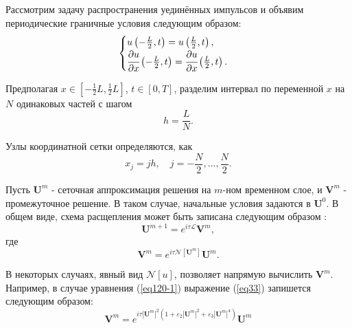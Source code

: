 \documentclass[14pt,a4paper]{extreport}
\begin{document}
			Рассмотрим задачу распространения уединённых импульсов и объявим периодические граничные условия следующим образом:
			\begin{equation} \label{eq30}
				\begin{aligned}
					\begin{cases}
						u\left(-\frac{L}{2},t\right)=u\left(\frac{L}{2},t\right),\\
						\cfrac{\partial u}{\partial x}\left(-\frac{L}{2},t\right)=\cfrac{\partial u}{\partial x}\left(\frac{L}{2},t\right).
					\end{cases}
				\end{aligned}
			\end{equation}

			Предполагая \( x \in [-\frac{1}{2} L, \frac{1}{2} L]\), \( t \in [0, T]\), разделим интервал по переменной \(x\) на \(N\) одинаковых частей с шагом
			\begin{equation}
				h=\frac{L}{N}.
			\end{equation}

			Узлы координатной сетки определяются, как
			\begin{equation}\label{eq220-2}
				x_{j}=jh, \quad j= -\frac{N}{2}, \ldots , \frac{N}{2}.
			\end{equation}

			Пусть \(\boldsymbol{U}^{m}\) - сеточная аппроксимация решения на \(m\)-ном временном слое, и \(\boldsymbol{V}^{m}\) - промежуточное решение. В таком случае, начальные условия задаются в \(\boldsymbol{U}^{0}\). В общем виде, схема расщепления может быть записана следующим образом \cite{Rad1}:
			\begin{equation}\label{eq34}
				\boldsymbol{U}^{m+1}=e^{i\tau\mathscr{L}}\boldsymbol{V}^m,
			\end{equation}
			где
			\begin{equation}\label{eq33}
				\boldsymbol{V}^m=e^{i\tau\mathscr{N}[\boldsymbol{U}^m]}\boldsymbol{U}^m.
			\end{equation}

			В некоторых случаях, явный вид \(\mathscr{N}[u]\), позволяет напрямую вычислить \(\boldsymbol{V}^m\). Например, в случае уравнения (\ref{eq120-1}) выражение (\ref{eq33}) запишется следующим образом:
			\begin{equation}\label{eq222}
				\boldsymbol{V}^m = e^{i\tau|\boldsymbol{U}^m|^2 \left(1 + \varepsilon_{2}|\boldsymbol{U}^m|^2+ \varepsilon_{3}|\boldsymbol{U}^m|^4\right)}\boldsymbol{U}^m
			\end{equation}
			
\end{document}
